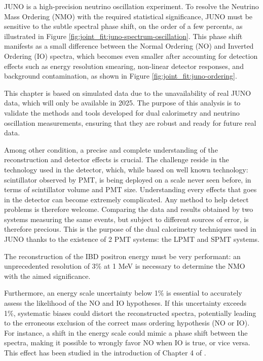 \documentclass[../main.tex]{subfiles}
\begin{document}
JUNO is a high-precision neutrino oscillation experiment. To resolve the Neutrino Mass Ordering (NMO) with the required statistical significance, JUNO must be sensitive to the subtle spectral phase shift, on the order of a few percents, as illustrated in Figure \ref{fig:joint_fit:juno-spectrum-oscillation}. This phase shift manifests as a small difference between the Normal Ordering (NO) and Inverted Ordering (IO) spectra, which becomes even smaller after accounting for detection effects such as energy resolution smearing, non-linear detector responses, and background contamination, as shown in Figure \ref{fig:joint_fit:juno-ordering}.


This chapter is based on simulated data due to the unavailability of real JUNO data, which will only be available in 2025. The purpose of this analysis is to validate the methods and tools developed for dual calorimetry and neutrino oscillation measurements, ensuring that they are robust and ready for future real data.

Among other condition, a precise and complete understanding of the reconstruction and detector effects is crucial.
The challenge reside in the technology used in the detector, which, while based on well known technology: scintillator observed by PMT, is being deployed on a scale never seen before, in terms of scintillator volume and  PMT size. Understanding every effects that goes in the detector can become extremely complicated. Any method to help detect problems is therefore welcome.
Comparing the data and results obtained by two systems measuring the same events, but subject to different sources of error, is therefore precious. This is the purpose of the dual calorimetry techniques used in JUNO thanks to the existence of 2 PMT systems: the LPMT and SPMT systems.

The reconstruction of the IBD positron energy must be very performant: an unprecedented resolution of 3\% at 1 MeV \cite{juno_collaboration_juno_2022} is necessary to determine the NMO with the aimed significance.

Furthermore, an energy scale uncertainty below 1\% is essential to accurately assess the likelihood of the NO and IO hypotheses. If this uncertainty exceeds 1\%, systematic biases could distort the reconstructed spectra, potentially leading to the erroneous exclusion of the correct mass ordering hypothesis (NO or IO). For instance, a shift in the energy scale could mimic a phase shift between the spectra, making it possible to wrongly favor NO when IO is true, or vice versa. This effect has been studied in the introduction of Chapter 4 of \cite{han_dual_2021}.
\end{document}
